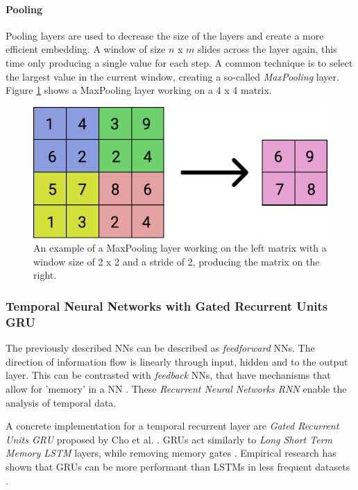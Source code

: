 \paragraph{Pooling}
Pooling layers are used to decrease the size of the layers and create a more efficient embedding. A window of size $n$ x $m$ slides across the layer again, this time only producing a single value for each step. A common technique is to select the largest value in the current window, creating a so-called \emph{MaxPooling} layer. Figure \ref{fig:pooling} shows a MaxPooling layer working on a 4 x 4 matrix.

\begin{figure}
    \centering
    \includegraphics{res/pooling.pdf}
    \caption{An example of a MaxPooling layer working on the left matrix with a window size of 2 x 2 and a stride of 2, producing the matrix on the right.}
    \label{fig:pooling}
\end{figure}

\subsubsection{Temporal Neural Networks with Gated Recurrent Units GRU}
The previously described NNs can be described as \emph{feedforward} NNs. The direction of information flow is linearly through input, hidden and to the output layer. This can be contrasted with \emph{feedback} NNs, that have mechanisms that allow for 'memory' in a NN \cite{wang2003artificial}. These \emph{Recurrent Neural Networks RNN} enable the analysis of temporal data.

A concrete implementation for a temporal recurrent layer are \emph{Gated Recurrent Units GRU} proposed by Cho et al. \cite{cho2014properties} \cite{chung2014empirical}. GRUs act similarly to \emph{Long Short Term Memory LSTM} \cite{hochreiter1997lstm} layers, while removing memory gates \cite{chung2014empirical}. Empirical research has shown that GRUs can be more performant than LSTMs in less frequent datasets \cite{gruber2020gru}.


